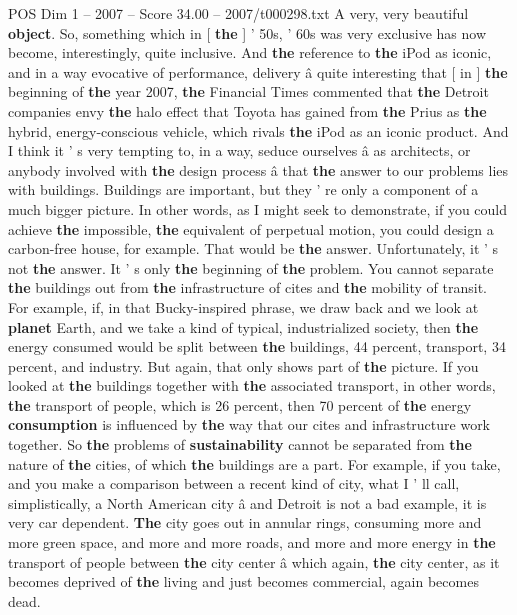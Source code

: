 \begin{textsample}{POS Dim 1 – 2007 – Score 34.00 – 2007/t000298.txt}
A very, very beautiful \textbf{object}.
So, something which in [ \textbf{the} ] ' 50s, ' 60s was very exclusive has now become, interestingly, quite inclusive.
And \textbf{the} reference to \textbf{the} iPod as iconic, and in a way evocative of performance, delivery â quite interesting that [ in ] \textbf{the} beginning of \textbf{the} year 2007, \textbf{the} Financial Times commented that \textbf{the} Detroit companies envy \textbf{the} halo effect that Toyota has gained from \textbf{the} Prius as \textbf{the} hybrid, energy-conscious vehicle, which rivals \textbf{the} iPod as an iconic product.
And I think it ' s very tempting to, in a way, seduce ourselves â as architects, or anybody involved with \textbf{the} design process â that \textbf{the} answer to our problems lies with buildings.
Buildings are important, but they ' re only a component of a much bigger picture.
In other words, as I might seek to demonstrate, if you could achieve \textbf{the} impossible, \textbf{the} equivalent of perpetual motion, you could design a carbon-free house, for example.
That would be \textbf{the} answer.
Unfortunately, it ' s not \textbf{the} answer.
It ' s only \textbf{the} beginning of \textbf{the} problem.
You cannot separate \textbf{the} buildings out from \textbf{the} infrastructure of cites and \textbf{the} mobility of transit.
For example, if, in that Bucky-inspired phrase, we draw back and we look at \textbf{planet} Earth, and we take a kind of typical, industrialized society, then \textbf{the} energy consumed would be split between \textbf{the} buildings, 44 percent, transport, 34 percent, and industry.
But again, that only shows part of \textbf{the} picture.
If you looked at \textbf{the} buildings together with \textbf{the} associated transport, in other words, \textbf{the} transport of people, which is 26 percent, then 70 percent of \textbf{the} energy \textbf{consumption} is influenced by \textbf{the} way that our cites and infrastructure work together.
So \textbf{the} problems of \textbf{sustainability} cannot be separated from \textbf{the} nature of \textbf{the} cities, of which \textbf{the} buildings are a part.
For example, if you take, and you make a comparison between a recent kind of city, what I ' ll call, simplistically, a North American city â and Detroit is not a bad example, it is very car dependent. \textbf{The} city goes out in annular rings, consuming more and more green space, and more and more roads, and more and more energy in \textbf{the} transport of people between \textbf{the} city center â which again, \textbf{the} city center, as it becomes deprived of \textbf{the} living and just becomes commercial, again becomes dead.

\end{textsample}

